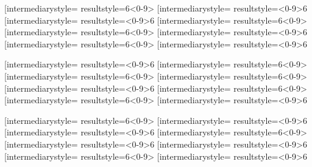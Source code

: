 \documentclass[letterpaper, 17pt]{article}
\newcommand{\white}[1]{}
\begin{document}
\begin{center}
	\vspace{0.3in}

	\opmul[intermediarystyle=\white, resultstyle=\white]{6}{<0-9>}\qquad
	\opmul[intermediarystyle=\white, resultstyle=\white]{<0-9>}{6}\qquad
	\opmul[intermediarystyle=\white, resultstyle=\white]{<0-9>}{6}\qquad
	\opmul[intermediarystyle=\white, resultstyle=\white]{6}{<0-9>}\qquad
	\opmul[intermediarystyle=\white, resultstyle=\white]{6}{<0-9>}\qquad
	\opmul[intermediarystyle=\white, resultstyle=\white]{<0-9>}{6}\qquad
	\opmul[intermediarystyle=\white, resultstyle=\white]{6}{<0-9>}\qquad
	\opmul[intermediarystyle=\white, resultstyle=\white]{<0-9>}{6}\qquad

	\vspace{0.3in}

	\opmul[intermediarystyle=\white, resultstyle=\white]{<0-9>}{6}\qquad
	\opmul[intermediarystyle=\white, resultstyle=\white]{6}{<0-9>}\qquad
	\opmul[intermediarystyle=\white, resultstyle=\white]{6}{<0-9>}\qquad
	\opmul[intermediarystyle=\white, resultstyle=\white]{6}{<0-9>}\qquad
	\opmul[intermediarystyle=\white, resultstyle=\white]{<0-9>}{6}\qquad
	\opmul[intermediarystyle=\white, resultstyle=\white]{6}{<0-9>}\qquad
	\opmul[intermediarystyle=\white, resultstyle=\white]{6}{<0-9>}\qquad
	\opmul[intermediarystyle=\white, resultstyle=\white]{<0-9>}{6}\qquad

	\vspace{0.3in}

	\opmul[intermediarystyle=\white, resultstyle=\white]{6}{<0-9>}\qquad
	\opmul[intermediarystyle=\white, resultstyle=\white]{<0-9>}{6}\qquad
	\opmul[intermediarystyle=\white, resultstyle=\white]{<0-9>}{6}\qquad
	\opmul[intermediarystyle=\white, resultstyle=\white]{6}{<0-9>}\qquad
	\opmul[intermediarystyle=\white, resultstyle=\white]{<0-9>}{6}\qquad
	\opmul[intermediarystyle=\white, resultstyle=\white]{<0-9>}{6}\qquad
	\opmul[intermediarystyle=\white, resultstyle=\white]{6}{<0-9>}\qquad
	\opmul[intermediarystyle=\white, resultstyle=\white]{<0-9>}{6}\qquad


\end{center}
\end{document}
